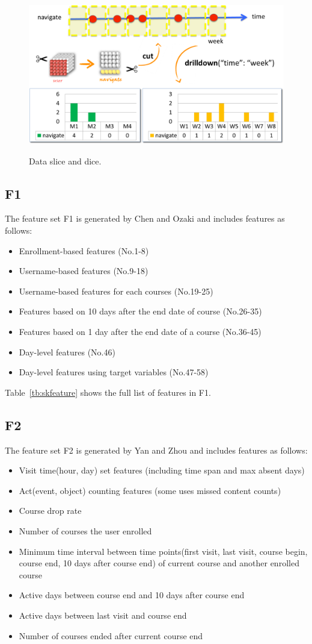 \begin{figure}[!t]
	\centering
	\includegraphics[width=0.5 \textwidth]{slice_and_dice}
	\label{fig:slice}
	\caption{Data slice and dice.}
\end{figure}

\subsection{F1}

The feature set F1 is generated by Chen and Ozaki and includes features as follows:

\begin{itemize}
  \setlength\itemsep{0em}
  \item Enrollment-based features (No.1-8)
  \item Username-based features (No.9-18)
  \item Username-based features for each courses (No.19-25) 
  \item Features based on 10 days after the end date of course (No.26-35)
  \item Features based on 1 day after the end date of a course (No.36-45)
  \item Day-level features (No.46)
  \item Day-level features using target variables (No.47-58)
\end{itemize}

Table~\ref{tb:skfeature} shows the full list of features in F1.

\subsection{F2}
The feature set F2 is generated by Yan and Zhou and includes features as follows:
\begin{itemize}
  \setlength\itemsep{0em}
  \item Visit time(hour, day) set features (including time span and max absent days)
  \item Act(event, object) counting features (some uses missed content counts)
  \item Course drop rate
  \item Number of courses the user enrolled
  \item Minimum time interval between time points(first visit, last visit, course begin, course end, 10 days after course end) of current course and another enrolled course
  \item Active days between course end and 10 days after course end
  \item Active days between last visit and course end
  \item Number of courses ended after current course end
\end{itemize}

